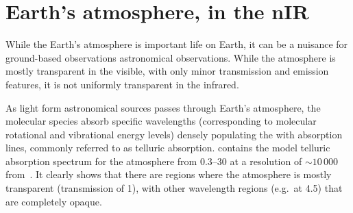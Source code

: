 
\section{Earth's atmosphere, in the nIR}

While the Earth's atmosphere is important life on Earth, it can be a nuisance for ground-based observations astronomical observations.
While the atmosphere is mostly transparent in the visible, with only minor transmission and emission features, it is not uniformly transparent in the infrared.

As light form astronomical sources passes through Earth's atmosphere, the molecular species absorb specific wavelengths (corresponding to molecular rotational and vibrational energy levels) densely populating the \nir{} with absorption lines, commonly referred to as telluric absorption.
 contains the model telluric absorption spectrum for the atmosphere from 0.3--30\um{} at a resolution of $\sim 10\,000$ from~\citet{smette_molecfit_2015}.
It clearly shows that there are regions where the atmosphere is mostly transparent (transmission of 1), with other wavelength regions (e.g.\ at 4.5\um{}) that are completely opaque.

